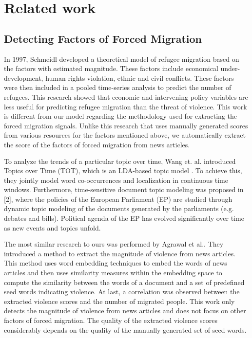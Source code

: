 \section{Related work}
\subsection{Detecting Factors of Forced Migration}
In 1997, Schmeidl \cite{schmeidl1997exploring} developed a theoretical model of refugee migration based on the factors with estimated magnitude. These factors include economical under-development, human rights violation, ethnic and civil conflicts. These factors were then included in a pooled time-series analysis to predict the number of refugees. This research showed that economic and intervening policy variables are less useful for predicting refugee migration than the threat of violence. This work is different from our model regarding the methodology used for extracting the forced migration signals. Unlike this research that uses manually generated scores from various resources for the factors mentioned above, we automatically extract the score of the factors of forced migration from news articles.

To analyze the trends of a particular topic over time, Wang et. al. introduced Topics over Time (TOT), which is an LDA-based topic model \cite{Wang2006}. To achieve this, they jointly model word co-occurrences and localization in continuous time windows. Furthermore, time-sensitive document topic modeling was proposed in [2], where the policies of the European Parliament (EP) are studied through dynamic topic modeling of the documents generated by the parliaments (e.g. debates and bills). Political agenda of the EP has evolved significantly over time as new events and topics unfold. 

The most similar research to ours was performed by Agrawal et al.\cite{agrawal2016detecting}. They introduced a method to extract the magnitude of violence from news articles. This method uses word embedding techniques to embed the words of news articles and then uses similarity measures within the embedding space to compute the similarity between the words of a document and a set of predefined seed words indicating violence. At last, a correlation was observed between the extracted violence scores and the number of migrated people. This work only detects the magnitude of violence from news articles and does not focus on other factors of forced migration. The quality of the extracted violence scores considerably depends on the quality of the manually generated set of seed words.

